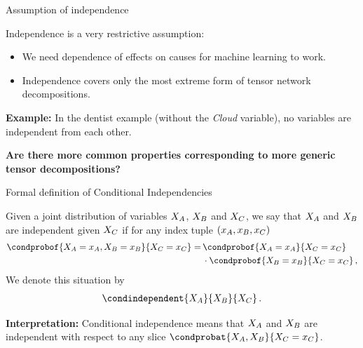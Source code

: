 \documentclass{beamer}
\begin{document}
    \begin{frame}{Assumption of independence}

        Independence is a very restrictive assumption:
        \begin{itemize}
            \item We need dependence of effects on causes for machine learning to work.
            \item Independence covers only the most extreme form of tensor network decompositions.
        \end{itemize}
        \medskip
        {\bf Example:} In the dentist example (without the \emph{Cloud} variable), no variables are independent from each other.
        \begin{center}
            \bf Are there more common properties corresponding to more generic tensor decompositions?
        \end{center}
    \end{frame}


    \begin{frame}{Formal definition of Conditional Independencies}

        \begin{definition}
	        Given a joint distribution of variables $X_{A}$, $X_{B}$ and $X_{C}$, we say that $X_{A}$ and $X_{B}$ are independent given $X_{C}$ if for any index tuple $(x_{A},x_{B},x_{C})$
            \begin{align*}
                \condprobof{\indexedcatvariableof{\nodesa},\indexedcatvariableof{\nodesb}}{\indexedcatvariableof{\nodesc}}
                =  \, & \condprobof{\indexedcatvariableof{\nodesa}}{\indexedcatvariableof{\nodesc}}\\
                & \cdot \condprobof{\indexedcatvariableof{\nodesb}}{\indexedcatvariableof{\nodesc}}   \, ,
            \end{align*}
            We denote this situation by
            \begin{align*}
                \condindependent{\catvariableof{\nodesa}}{\catvariableof{\nodesb}}{\catvariableof{\nodesc}} \, .
            \end{align*}
        \end{definition}

            {\bf Interpretation:} Conditional independence means that $X_{A}$ and $X_{B}$ are independent with respect to any slice $\condprobat{\catvariableof{\nodesa},\catvariableof{\nodesb}}{\indexedcatvariableof{\nodesc}}$.

    \end{frame}
\end{document}

